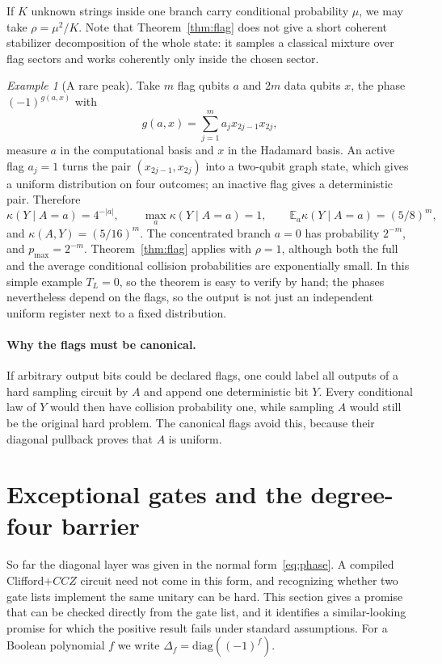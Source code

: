 \documentclass[a4paper,onecolumn,11pt,unpublished]{quantumarticle}
\theoremstyle{plain}
\theoremstyle{remark}
\newtheorem{example}[theorem]{Example}
\newcommand{\E}{\mathbb{E}}
\begin{document}
If $K$ unknown strings inside one branch carry conditional probability $\mu$, we may take $\rho=\mu^2/K$. Note that Theorem~\ref{thm:flag} does not give a short coherent stabilizer decomposition of the whole state: it samples a classical mixture over flag sectors and works coherently only inside the chosen sector.

\begin{example}[A rare peak]\label{ex:flag}
Take $m$ flag qubits $a$ and $2m$ data qubits $x$, the phase $(-1)^{g(a,x)}$ with
\[
g(a,x)=\sum_{j=1}^m a_jx_{2j-1}x_{2j},
\]
measure $a$ in the computational basis and $x$ in the Hadamard basis. An active flag $a_j=1$ turns the pair $(x_{2j-1},x_{2j})$ into a two-qubit graph state, which gives a uniform distribution on four outcomes; an inactive flag gives a deterministic pair. Therefore
\[
\kappa(Y\mid A=a)=4^{-|a|},\qquad\max_a\kappa(Y\mid A=a)=1,\qquad\E_a\kappa(Y\mid A=a)=(5/8)^m,
\]
and $\kappa(A,Y)=(5/16)^m$. The concentrated branch $a=0$ has probability $2^{-m}$, and $p_{\max}=2^{-m}$. Theorem~\ref{thm:flag} applies with $\rho=1$, although both the full and the average conditional collision probabilities are exponentially small. In this simple example $T_L=0$, so the theorem is easy to verify by hand; the phases nevertheless depend on the flags, so the output is not just an independent uniform register next to a fixed distribution.
\end{example}

\paragraph{Why the flags must be canonical.}
If arbitrary output bits could be declared flags, one could label all outputs of a hard sampling circuit by $A$ and append one deterministic bit $Y$. Every conditional law of $Y$ would then have collision probability one, while sampling $A$ would still be the original hard problem. The canonical flags avoid this, because their diagonal pullback proves that $A$ is uniform.

\section{Exceptional gates and the degree-four barrier}\label{sec:defect}

So far the diagonal layer was given in the normal form~\eqref{eq:phase}. A compiled Clifford+$CCZ$ circuit need not come in this form, and recognizing whether two gate lists implement the same unitary can be hard. This section gives a promise that can be checked directly from the gate list, and it identifies a similar-looking promise for which the positive result fails under standard assumptions. For a Boolean polynomial $f$ we write $\Delta_f=\mathrm{diag}((-1)^{f})$.
\end{document}
